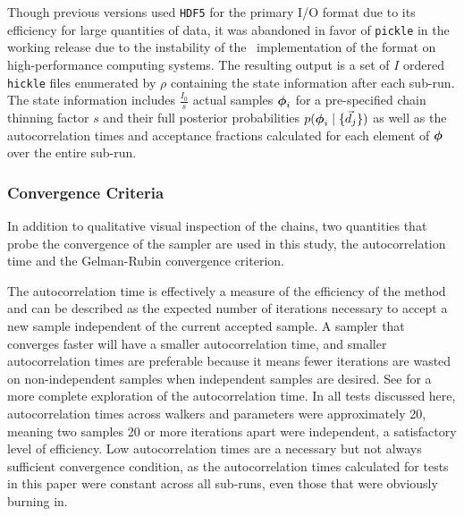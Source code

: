 Though previous versions used \texttt{HDF5} for the primary I/O format due to its efficiency for large quantities of data, it was abandoned in favor of \texttt{pickle} in the working release due to the instability of the \python\ implementation of the format on high-performance computing systems.  
The resulting output is a set of $I$ ordered \texttt{hickle} files enumerated by $\rho$ containing the state information after each sub-run.  
The state information includes $\frac{I_{0}}{s}$ actual samples ${\boldsymbol{\phi}}_{i}$ for a pre-specified chain thinning factor $s$ and their full posterior probabilities $p({\boldsymbol{\phi}}_{i} \mid \{\vec{d}_{j}\})$ as well as the autocorrelation times and acceptance fractions calculated for each element of ${\boldsymbol{\phi}}$ over the entire sub-run.  

\subsubsection{Convergence Criteria}

In addition to qualitative visual inspection of the chains, two quantities that probe the convergence of the sampler are used in this study, the autocorrelation time and the Gelman-Rubin convergence criterion.  


The autocorrelation time is effectively a measure of the efficiency of the method and can be described as the expected number of iterations necessary to accept a new sample independent of the current accepted sample.  
A sampler that converges faster will have a smaller autocorrelation time, and smaller autocorrelation times are preferable because it means fewer iterations are wasted on non-independent samples when independent samples are desired.  
See \citet{Foreman-Mackey2013} for a more complete exploration of the autocorrelation time.  
In all tests discussed here, autocorrelation times across walkers and parameters were approximately 20, meaning two samples 20 or more iterations apart were independent, a satisfactory level of efficiency.  
Low autocorrelation times are a necessary but not always sufficient convergence condition, as the autocorrelation times calculated for tests in this paper were constant across all sub-runs, even those that were obviously burning in.  

